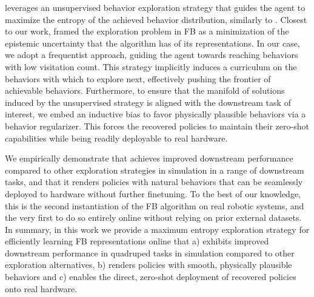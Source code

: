 \method leverages an unsupervised behavior exploration strategy that guides the agent to maximize the entropy of the achieved behavior distribution,  similarly to \citep{pitis2020maximum}. 
Closest to our work, \citep{urpiepistemically} framed the exploration problem in FB as a minimization of the epistemic uncertainty that the algorithm has of its representations.
In our case, we adopt a frequentist approach, guiding the agent towards reaching behaviors with low visitation count. This strategy implicitly induces a curriculum on the behaviors with which to explore next, effectively pushing the frontier of achievable behaviors. Furthermore, to ensure that the manifold of solutions induced by the unsupervised strategy is aligned with the downstream task of interest,  we embed an inductive bias to favor physically plausible behaviors via a behavior regularizer. This forces the recovered policies to maintain their zero-shot capabilities while being readily deployable to real hardware. 

We empirically demonstrate that \method achieves improved downstream performance compared to other exploration strategies in simulation in a range of downstream tasks, and that it renders policies with natural behaviors that can be seamlessly deployed to hardware without further finetuning.
To the best of our knowledge, this is the second instantiation of the FB algorithm on real robotic systems, and the very first to do so entirely online without relying on prior external datasets.
In summary, in this work we provide a maximum entropy exploration strategy for efficiently learning FB representations online that %
a) exhibits improved downstream performance in quadruped tasks in simulation compared to other exploration alternatives,
b) renders policies with smooth, physically plausible behaviors and 
c) enables the direct, zero-shot deployment of recovered policies onto real hardware.

